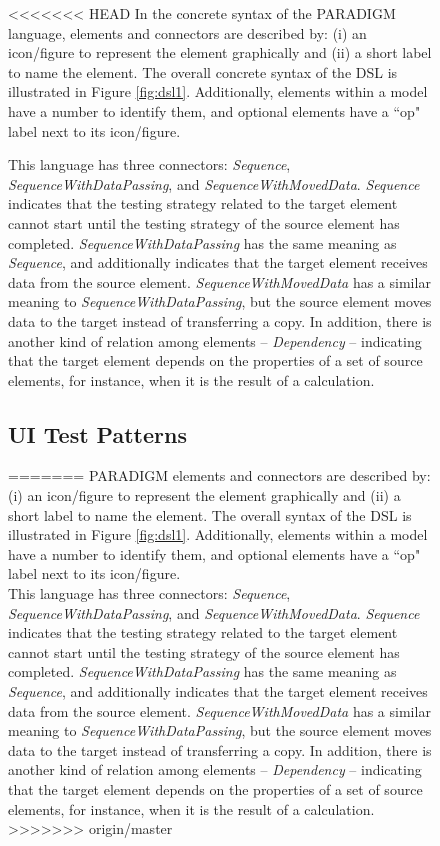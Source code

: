 \documentclass[conference]{IEEEtran}
\begin{document}
\begin{enumerate}
\begin{figure}[!htb]
<<<<<<< HEAD
In the concrete syntax of the PARADIGM language, elements and connectors are described by: (i) an icon/figure to represent the element graphically and (ii) a short label to name the element. The overall concrete syntax of the DSL is illustrated in Figure \ref{fig:dsl1}. Additionally, elements within a model have a number to identify them, and optional elements have a ``op" label next to its icon/figure.

This language has three connectors: \textit{Sequence}, \textit{SequenceWithDataPassing}, and \textit{SequenceWithMovedData}. \textit{Sequence} indicates that the testing strategy related to the target element cannot start until the testing strategy of the source element has completed. \textit{SequenceWithDataPassing} has the same meaning as \textit{Sequence}, and additionally indicates that the target element receives data from the source element. \textit{SequenceWithMovedData} has a similar meaning to \textit{SequenceWithDataPassing}, but the source element moves data to the target instead of transferring a copy. In addition, there is another kind of relation among elements -- \textit{Dependency} -- indicating that the target element depends on the properties of a set of source elements, for instance, when it is the result of a calculation. 

\subsection{UI Test Patterns}\label{sec:uitp}
=======
PARADIGM elements and connectors are described by: (i) an icon/figure to represent the element graphically and (ii) a short label to name the element. The overall syntax of the DSL is illustrated in Figure \ref{fig:dsl1}. Additionally, elements within a model have a number to identify them, and optional elements have a ``op" label next to its icon/figure.\\

This language has three connectors: \textit{Sequence}, \textit{SequenceWithDataPassing}, and \textit{SequenceWithMovedData}. \textit{Sequence} indicates that the testing strategy related to the target element cannot start until the testing strategy of the source element has completed. \textit{SequenceWithDataPassing} has the same meaning as \textit{Sequence}, and additionally indicates that the target element receives data from the source element. \textit{SequenceWithMovedData} has a similar meaning to \textit{SequenceWithDataPassing}, but the source element moves data to the target instead of transferring a copy. In addition, there is another kind of relation among elements -- \textit{Dependency} -- indicating that the target element depends on the properties of a set of source elements, for instance, when it is the result of a calculation. \\
>>>>>>> origin/master


\end{figure}
\end{enumerate}
\end{document}
